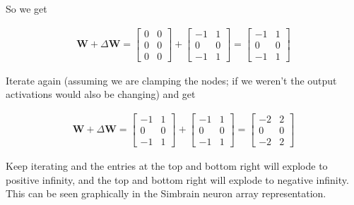 So we get

\begin{align*}
\mathbf{W} + \Delta \mathbf{W}  =
\begin{bmatrix} 0 & 0 \\ 0 & 0 \\  0  & 0  \end{bmatrix} +
\begin{bmatrix} -1 & 1 \\ 0 & 0 \\  -1 & 1  \end{bmatrix} =
\begin{bmatrix} -1 & 1 \\ 0 & 0 \\  -1 & 1  \end{bmatrix}
\end{align*}

Iterate again (assuming we are clamping the nodes; if we weren't the output activations would also be changing) and get


\begin{align*}
\mathbf{W} + \Delta \mathbf{W}  =
\begin{bmatrix} -1 & 1 \\ 0 & 0 \\  -1 & 1  \end{bmatrix} +
\begin{bmatrix} -1 & 1 \\ 0 & 0 \\  -1 & 1  \end{bmatrix} =
\begin{bmatrix} -2 & 2 \\ 0 & 0 \\  -2 & 2  \end{bmatrix}
\end{align*}

Keep iterating and the entries at the top and bottom right will explode to positive infinity, and the top and bottom right will explode to negative infinity. This can be seen graphically in the Simbrain neuron array representation.